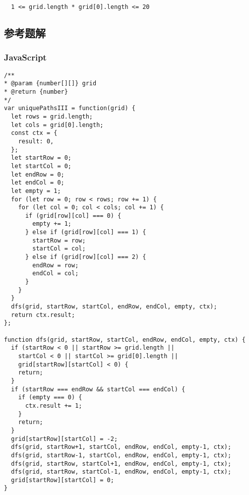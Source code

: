 \begin{verbatim}
  1 <= grid.length * grid[0].length <= 20
\end{verbatim}

\subsection{参考题解}

\subsubsection{JavaScript}

\begin{verbatim}
/**
* @param {number[][]} grid
* @return {number}
*/
var uniquePathsIII = function(grid) {
  let rows = grid.length;
  let cols = grid[0].length;
  const ctx = {
    result: 0,
  };
  let startRow = 0;
  let startCol = 0;
  let endRow = 0;
  let endCol = 0;
  let empty = 1;
  for (let row = 0; row < rows; row += 1) {
    for (let col = 0; col < cols; col += 1) {
      if (grid[row][col] === 0) {
        empty += 1;
      } else if (grid[row][col] === 1) {
        startRow = row;
        startCol = col;
      } else if (grid[row][col] === 2) {
        endRow = row;
        endCol = col;
      }
    }
  }
  dfs(grid, startRow, startCol, endRow, endCol, empty, ctx);
  return ctx.result;
};

function dfs(grid, startRow, startCol, endRow, endCol, empty, ctx) {
  if (startRow < 0 || startRow >= grid.length ||
    startCol < 0 || startCol >= grid[0].length ||
    grid[startRow][startCol] < 0) {
    return;
  }
  if (startRow === endRow && startCol === endCol) {
    if (empty === 0) {
      ctx.result += 1;
    }
    return;
  }
  grid[startRow][startCol] = -2;
  dfs(grid, startRow+1, startCol, endRow, endCol, empty-1, ctx);
  dfs(grid, startRow-1, startCol, endRow, endCol, empty-1, ctx);
  dfs(grid, startRow, startCol+1, endRow, endCol, empty-1, ctx);
  dfs(grid, startRow, startCol-1, endRow, endCol, empty-1, ctx);
  grid[startRow][startCol] = 0;
}
\end{verbatim}
